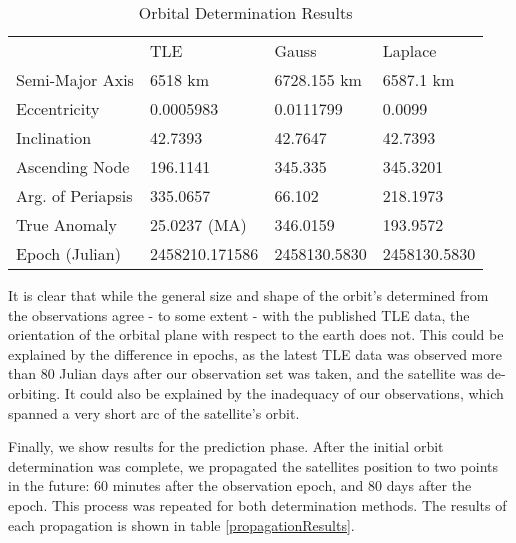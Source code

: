 \documentclass[11pt,twoside,letterpaper]{article}
\begin{document}
  \begin{table}[]
    \centering
    \begin{tabular}{llll}
      & TLE & Gauss & Laplace \\ \cline{2-4} 
      \multicolumn{1}{l|}{Semi-Major Axis} & \multicolumn{1}{l|}{6518 km} & \multicolumn{1}{l|}{6728.155 km} & \multicolumn{1}{l|}{6587.1 km} \\ \cline{2-4} 
      \multicolumn{1}{l|}{Eccentricity} & \multicolumn{1}{l|}{0.0005983} & \multicolumn{1}{l|}{0.0111799} & \multicolumn{1}{l|}{0.0099} \\ \cline{2-4} 
      \multicolumn{1}{l|}{Inclination} & \multicolumn{1}{l|}{42.7393} & \multicolumn{1}{l|}{42.7647} & \multicolumn{1}{l|}{42.7393} \\ \cline{2-4} 
      \multicolumn{1}{l|}{Ascending Node} & \multicolumn{1}{l|}{196.1141} & \multicolumn{1}{l|}{345.335} & \multicolumn{1}{l|}{345.3201} \\ \cline{2-4} 
      \multicolumn{1}{l|}{Arg. of Periapsis} & \multicolumn{1}{l|}{335.0657} & \multicolumn{1}{l|}{66.102} & \multicolumn{1}{l|}{218.1973} \\ \cline{2-4} 
      \multicolumn{1}{l|}{True Anomaly} & \multicolumn{1}{l|}{25.0237 (MA)} & \multicolumn{1}{l|}{346.0159} & \multicolumn{1}{l|}{193.9572} \\ \cline{2-4} 
      \multicolumn{1}{l|}{Epoch (Julian)} & \multicolumn{1}{l|}{2458210.171586} & \multicolumn{1}{l|}{2458130.5830} & \multicolumn{1}{l|}{2458130.5830} \\ \cline{2-4} 
    \end{tabular}
    \caption{Orbital Determination Results}
    \label{resultsTable}
  \end{table}

  It is clear that while the general size and shape of the orbit's
  determined from the observations agree - to some extent - with the
  published TLE data, the orientation of the orbital plane with
  respect to the earth does not. This could be explained by the
  difference in epochs, as the latest TLE data was observed more than
  80 Julian days after our observation set was taken, and the
  satellite was de-orbiting. It could also be explained by the
  inadequacy of our observations, which spanned a very short arc of
  the satellite's orbit.

  Finally, we show results for the prediction phase. After the initial
  orbit determination was complete, we propagated the satellites
  position to two points in the future: 60 minutes after the
  observation epoch, and 80 days after the epoch. This process was
  repeated for both determination methods. The results of each
  propagation is shown in table \ref{propagationResults}.
\end{document}

